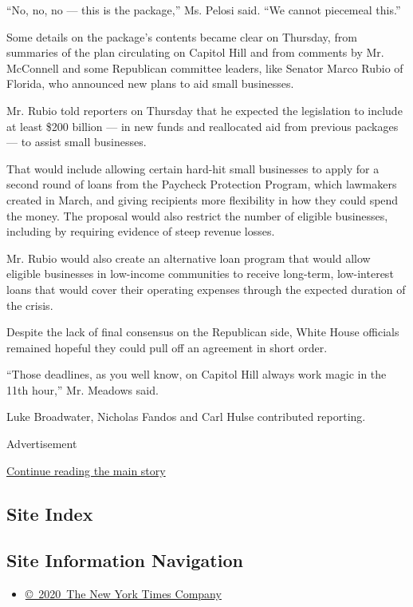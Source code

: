 ``No, no, no --- this is the package,'' Ms. Pelosi said. ``We cannot
piecemeal this.''

Some details on the package's contents became clear on Thursday, from
summaries of the plan circulating on Capitol Hill and from comments by
Mr. McConnell and some Republican committee leaders, like Senator Marco
Rubio of Florida, who announced new plans to aid small businesses.

Mr. Rubio told reporters on Thursday that he expected the legislation to
include at least \$200 billion --- in new funds and reallocated aid from
previous packages --- to assist small businesses.

That would include allowing certain hard-hit small businesses to apply
for a second round of loans from the Paycheck Protection Program, which
lawmakers created in March, and giving recipients more flexibility in
how they could spend the money. The proposal would also restrict the
number of eligible businesses, including by requiring evidence of steep
revenue losses.

Mr. Rubio would also create an alternative loan program that would allow
eligible businesses in low-income communities to receive long-term,
low-interest loans that would cover their operating expenses through the
expected duration of the crisis.

Despite the lack of final consensus on the Republican side, White House
officials remained hopeful they could pull off an agreement in short
order.

``Those deadlines, as you well know, on Capitol Hill always work magic
in the 11th hour,'' Mr. Meadows said.

Luke Broadwater, Nicholas Fandos and Carl Hulse contributed reporting.

Advertisement

\protect\hyperlink{after-bottom}{Continue reading the main story}

\hypertarget{site-index}{%
\subsection{Site Index}\label{site-index}}

\hypertarget{site-information-navigation}{%
\subsection{Site Information
Navigation}\label{site-information-navigation}}

\begin{itemize}
\tightlist
\item
  \href{https://help.nytimes.com/hc/en-us/articles/115014792127-Copyright-notice}{©~2020~The
  New York Times Company}
\end{itemize}

